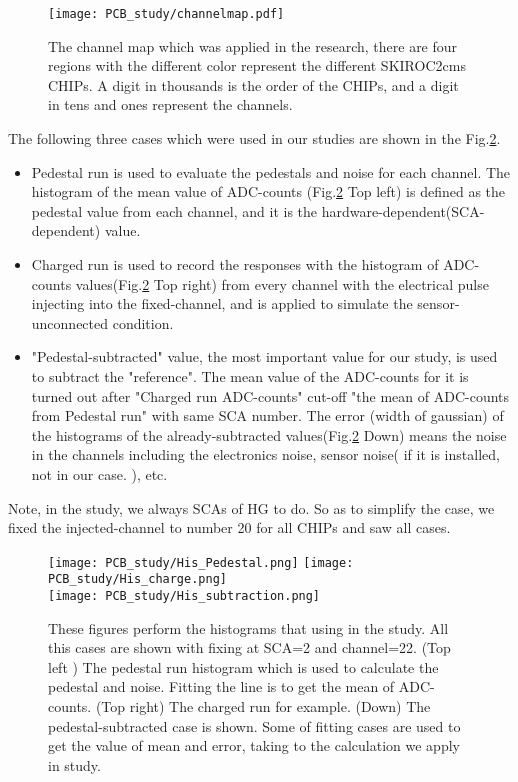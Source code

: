 \documentclass[12pt,twoside,a4paper,an,final]{cms-tdr}
\begin{document}
\begin{figure}[!htb]
\centering
     \texttt{[image: PCB\_study/channelmap.pdf]}
\caption{The channel map which was applied in the research, there are four regions with the different color represent the different SKIROC2cms CHIPs.  A digit in thousands is the order of the CHIPs, and a digit in tens and ones represent the channels.}
\label{fig:PCB_study_channelMap}
\end{figure}
The following three cases which were used in our studies are shown in the Fig.\ref{fig:PCB_His}.
\begin{itemize}
\item Pedestal run is used to evaluate the pedestals and noise for each channel. The histogram of the mean value of ADC-counts (Fig.\ref{fig:PCB_His} Top left) is defined as the pedestal value from each channel, and it is the hardware-dependent(SCA-dependent) value.
\item Charged run is used to record the responses with the histogram of ADC-counts values(Fig.\ref{fig:PCB_His} Top right) from every channel with the electrical pulse injecting into the fixed-channel, and is applied to simulate the sensor-unconnected condition.  
\item "Pedestal-subtracted" value, the most important value for our study, is used to subtract the "reference". The mean value of the ADC-counts for it is turned out after "Charged run ADC-counts" cut-off "the mean of ADC-counts from Pedestal run" with same SCA number. The error (width of gaussian) of the histograms of the already-subtracted values(Fig.\ref{fig:PCB_His} Down) means the noise in the channels including the electronics noise, sensor noise( if it is installed, not in our case. ), etc. 
\end{itemize}
Note, in the study, we always SCAs of HG to do. So as to simplify the case, we fixed the injected-channel to number 20 for all CHIPs and saw all cases.


\begin{figure}[!htb]
\centering
     \texttt{[image: PCB\_study/His\_Pedestal.png]}
     \texttt{[image: PCB\_study/His\_charge.png]}\\
     \texttt{[image: PCB\_study/His\_subtraction.png]}
\caption{These figures perform the histograms that using in the study. All this cases are shown with fixing at SCA=2 and channel=22. (Top left ) The pedestal run histogram which is used to calculate the pedestal and noise. Fitting the line is to get the mean of ADC-counts. (Top right)  The charged run for example. (Down) The pedestal-subtracted case is shown. Some of fitting cases are used to get the value of mean and error, taking to the calculation we apply in study.}
\label{fig:PCB_His}
\end{figure}
\end{document}
